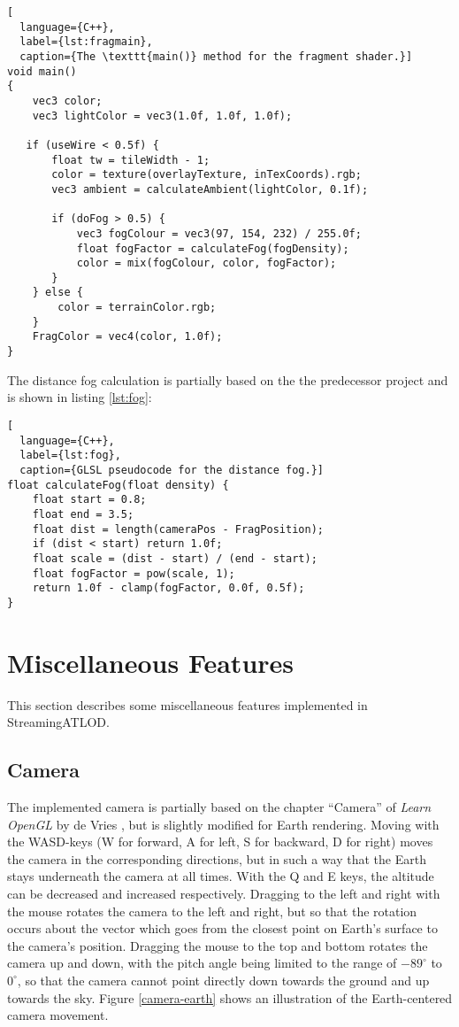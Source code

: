 \begin{lstlisting}[
  language={C++},
  label={lst:fragmain},
  caption={The \texttt{main()} method for the fragment shader.}]
void main()
{
    vec3 color;
    vec3 lightColor = vec3(1.0f, 1.0f, 1.0f);

   if (useWire < 0.5f) {
       float tw = tileWidth - 1;
       color = texture(overlayTexture, inTexCoords).rgb;
       vec3 ambient = calculateAmbient(lightColor, 0.1f);

       if (doFog > 0.5) {
           vec3 fogColour = vec3(97, 154, 232) / 255.0f;
           float fogFactor = calculateFog(fogDensity);
           color = mix(fogColour, color, fogFactor);
       }
    } else {
        color = terrainColor.rgb;
    }
    FragColor = vec4(color, 1.0f);
}
\end{lstlisting}

The distance fog calculation is partially based on the
the predecessor project \cite{p2} and is shown in listing \ref{lst:fog}:

\begin{lstlisting}[
  language={C++},
  label={lst:fog},
  caption={GLSL pseudocode for the distance fog.}]
float calculateFog(float density) {
    float start = 0.8;
    float end = 3.5;
    float dist = length(cameraPos - FragPosition);
    if (dist < start) return 1.0f;
    float scale = (dist - start) / (end - start);
    float fogFactor = pow(scale, 1);
    return 1.0f - clamp(fogFactor, 0.0f, 0.5f);
}
\end{lstlisting}

\section{Miscellaneous Features}
This section describes some 
miscellaneous features implemented 
in StreamingATLOD.

\subsection{Camera}
The implemented camera is partially based on the chapter ``Camera'' of \textit{Learn OpenGL} by de Vries \cite{learnopengl},
but is slightly modified for Earth rendering.
Moving with the WASD-keys (W for forward, A for left, S for backward, D for right) 
moves the camera in the corresponding 
directions, but in such a way that the Earth stays underneath the camera 
at all times. With the Q and E keys, the altitude can be decreased 
and increased respectively.
 Dragging to the left and right with the mouse
rotates the camera to the left and right, but so 
that the rotation occurs about the vector which goes from 
the closest point on Earth's surface to the camera's position.
Dragging the mouse to the top and bottom rotates 
the camera up and down, with the pitch angle 
being limited to the range of $-89^{\circ}$ to $0^{\circ}$,
so that the camera cannot point directly down towards 
the ground and up towards the sky.
Figure \ref{camera-earth} shows an illustration of the 
Earth-centered camera movement.

